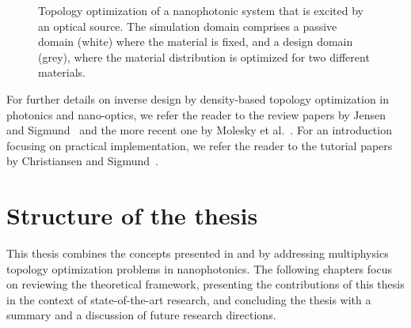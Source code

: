 \begin{figure}[tb]
    \centering
    \caption{Topology optimization of a nanophotonic system that is excited by an optical source. The simulation domain comprises a passive domain (white) where the material is fixed, and a design domain (grey), where the material distribution is optimized for two different materials.}
        \label{fig:top_opt}
\end{figure}

For further details on inverse design by density-based topology optimization in photonics and nano-optics, we refer the reader to
the review papers by Jensen and Sigmund~\cite{jensen_review} and the more recent one by Molesky et al.~\cite{Molesky_2018}. 
For an introduction focusing on practical implementation, we refer the reader to the tutorial papers by Christiansen and Sigmund~\cite{tutorial_matlab, tutorial_COMSOL}.

\section{Structure of the thesis}

This thesis combines the concepts presented in  and  by addressing multiphysics topology optimization problems in nanophotonics. The following chapters focus on reviewing
 the theoretical framework, presenting the contributions of this thesis in the context of state-of-the-art research,
  and concluding the thesis with a summary and a discussion of future research directions.


